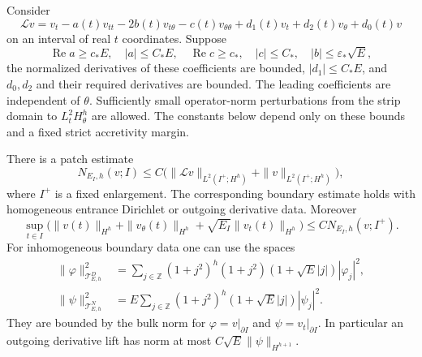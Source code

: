 \begin{lemma}\label{lin:strip}
Consider
\begin{equation}\label{lin:admissible-operator}
 \mathcal L v=v_t-a(t)v_{tt}-2b(t)v_{t\theta}
       -c(t)v_{\theta\theta}+d_1(t)v_t+d_2(t)v_\theta+d_0(t)v
\end{equation}
on an interval of real $t$ coordinates.  Suppose
\[
 \operatorname{Re}a\ge c_*E,\quad |a|\le C_*E,
 \quad\operatorname{Re}c\ge c_*,\quad |c|\le C_*,
 \quad |b|\le\varepsilon_*\sqrt E,
\]
the normalized derivatives of these coefficients are bounded,
$|d_1|\le C_*E$, and $d_0,d_2$ and their required derivatives are
bounded.  The leading coefficients are independent of $\theta$.
Sufficiently small operator-norm perturbations from the strip domain
to $L^2_tH^h_\theta$ are allowed.  The constants below depend only on
these bounds and a fixed strict accretivity margin.

There is a patch estimate
\begin{equation}\label{lin:patch}
 N_{E_I,h}(v;I)
 \le C\bigl(\|\mathcal Lv\|_{L^2(I^+;H^h)}
                   +\|v\|_{L^2(I^+;H^h)}\bigr),
\end{equation}
where $I^+$ is a fixed enlargement.  The corresponding boundary
estimate holds with homogeneous entrance Dirichlet or outgoing
derivative data.  Moreover
\begin{equation}\label{lin:first-traces}
 \sup_{t\in I}\bigl(\|v(t)\|_{H^h}
 +\|v_\theta(t)\|_{H^h}+\sqrt{E_I}\|v_t(t)\|_{H^h}\bigr)
 \le C N_{E_I,h}(v;I^+).
\end{equation}
For inhomogeneous boundary data one can use the spaces
\begin{align}
 \|\varphi\|_{\mathcal T^{D}_{E,h}}^2
 &=\sum_{j\in\mathbb Z}(1+j^2)^h(1+j^2)
                  (1+\sqrt E|j|)|\varphi_j|^2,
       \label{lin:dirichlet-trace}\\
 \|\psi\|_{\mathcal T^{N}_{E,h}}^2
 &=E\sum_{j\in\mathbb Z}(1+j^2)^h
                  (1+\sqrt E|j|)|\psi_j|^2.
       \label{lin:neumann-trace}
\end{align}
They are bounded by the bulk norm for $\varphi=v|_{\partial I}$ and
$\psi=v_t|_{\partial I}$.  In particular an outgoing derivative lift
has norm at most $C\sqrt E\|\psi\|_{H^{h+1}}$.
\end{lemma}

